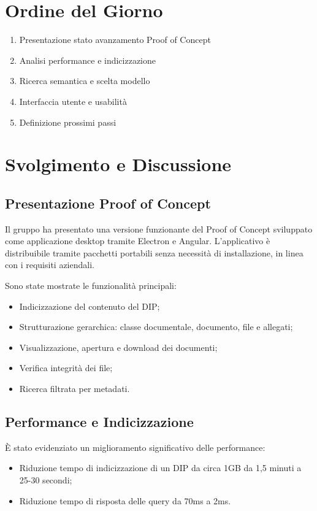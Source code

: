 \documentclass[a4paper,12pt]{article}
\begin{document}
\section{Ordine del Giorno}
\begin{enumerate}[noitemsep]
    \item Presentazione stato avanzamento Proof of Concept
    \item Analisi performance e indicizzazione
    \item Ricerca semantica e scelta modello
    \item Interfaccia utente e usabilità
    \item Definizione prossimi passi
\end{enumerate}

\section{Svolgimento e Discussione}

\subsection{Presentazione Proof of Concept}

Il gruppo ha presentato una versione funzionante del Proof of Concept sviluppato come applicazione desktop tramite Electron e Angular.  
L’applicativo è distribuibile tramite pacchetti portabili senza necessità di installazione, in linea con i requisiti aziendali.

Sono state mostrate le funzionalità principali:
\begin{itemize}
    \item Indicizzazione del contenuto del DIP;
    \item Strutturazione gerarchica: classe documentale, documento, file e allegati;
    \item Visualizzazione, apertura e download dei documenti;
    \item Verifica integrità dei file;
    \item Ricerca filtrata per metadati.
\end{itemize}

\subsection{Performance e Indicizzazione}

È stato evidenziato un miglioramento significativo delle performance:
\begin{itemize}
    \item Riduzione tempo di indicizzazione di un DIP da circa 1GB da 1,5 minuti a 25-30 secondi;
    \item Riduzione tempo di risposta delle query da 70ms a 2ms.
\end{itemize}
\end{document}
